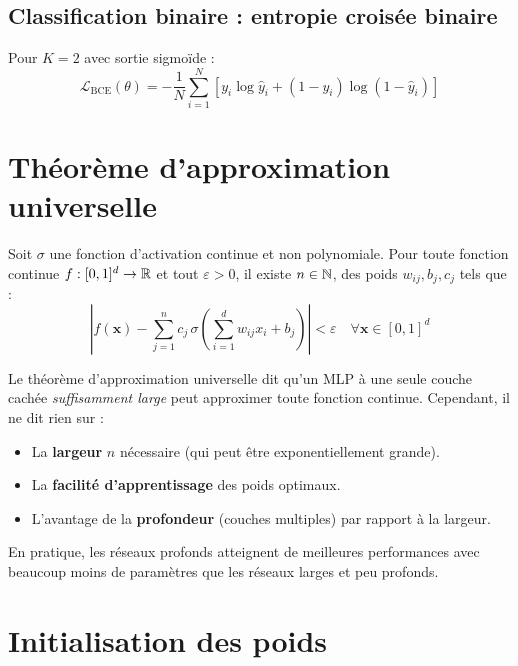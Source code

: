 \subsection{Classification binaire : entropie crois\'ee binaire}

Pour $K=2$ avec sortie sigmo\"ide :
\[
\mathcal{L}_{\mathrm{BCE}}(\theta) = -\frac{1}{N}\sum_{i=1}^{N} \left[y_i \log \hat{y}_i + (1-y_i)\log(1-\hat{y}_i)\right]
\]

\section{Th\'eor\`eme d'approximation universelle}
\label{sec:uat}

\begin{theoreme}
\label{thm:uat}
Soit $\sigma$ une fonction d'activation continue et non polynomiale. Pour toute fonction continue $f : [0,1]^d \to \mathbb{R}$ et tout $\varepsilon > 0$, il existe $n \in \mathbb{N}$, des poids $w_{ij}, b_j, c_j$ tels que :
\[
\left| f(\bm{x}) - \sum_{j=1}^{n} c_j \, \sigma\!\left(\sum_{i=1}^d w_{ij} x_i + b_j\right) \right| < \varepsilon \quad \forall \bm{x} \in [0,1]^d
\]
\end{theoreme}

\begin{intuition}
Le th\'eor\`eme d'approximation universelle dit qu'un MLP \`a une seule couche cach\'ee \emph{suffisamment large} peut approximer toute fonction continue. Cependant, il ne dit rien sur :
\begin{itemize}
\item La \textbf{largeur} $n$ n\'ecessaire (qui peut \^etre exponentiellement grande).
\item La \textbf{facilit\'e d'apprentissage} des poids optimaux.
\item L'avantage de la \textbf{profondeur} (couches multiples) par rapport \`a la largeur.
\end{itemize}
En pratique, les r\'eseaux profonds atteignent de meilleures performances avec beaucoup moins de param\`etres que les r\'eseaux larges et peu profonds.
\end{intuition}

\section{Initialisation des poids}
\label{sec:init}

